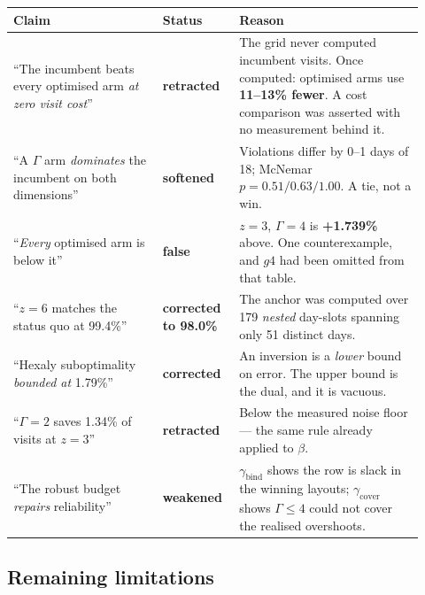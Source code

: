 \documentclass[11pt,a4paper]{article}
\newcommand{\gbind}{\gamma_{\mathrm{bind}}}
\newcommand{\gcover}{\gamma_{\mathrm{cover}}}
\begin{document}
\begin{center}
\small
\begin{tabular}{p{0.34\linewidth}p{0.16\linewidth}p{0.42\linewidth}}
\toprule
Claim & Status & Reason \\
\midrule
``The incumbent beats every optimised arm \emph{at zero visit cost}'' &
\textbf{retracted} &
The grid never computed incumbent visits. Once computed: optimised arms use
\textbf{11--13\% fewer}. A cost comparison was asserted with no measurement
behind it. \\
\addlinespace
``A $\Gamma$ arm \emph{dominates} the incumbent on both dimensions'' &
\textbf{softened} &
Violations differ by 0--1 days of 18; McNemar $p=0.51/0.63/1.00$. A tie, not a win. \\
\addlinespace
``\emph{Every} optimised arm is below it'' &
\textbf{false} &
$z=3$, $\Gamma=4$ is \textbf{+1.739\%} above. One counterexample, and $g4$ had
been omitted from that table. \\
\addlinespace
``$z=6$ matches the status quo at 99.4\%'' &
\textbf{corrected to 98.0\%} &
The anchor was computed over 179 \emph{nested} day-slots spanning only 51
distinct days. \\
\addlinespace
``Hexaly suboptimality \emph{bounded at} 1.79\%'' &
\textbf{corrected} &
An inversion is a \emph{lower} bound on error. The upper bound is the dual, and
it is vacuous. \\
\addlinespace
``$\Gamma=2$ saves 1.34\% of visits at $z=3$'' &
\textbf{retracted} &
Below the measured noise floor --- the same rule already applied to $\beta$. \\
\addlinespace
``The robust budget \emph{repairs} reliability'' &
\textbf{weakened} &
$\gbind$ shows the row is slack in the winning layouts; $\gcover$ shows
$\Gamma\le4$ could not cover the realised overshoots. \\
\bottomrule
\end{tabular}
\end{center}

\subsection{Remaining limitations}
\end{document}
